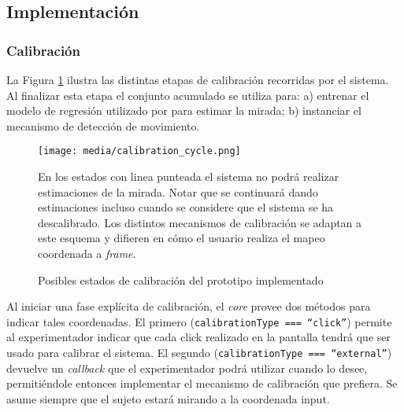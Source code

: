 




\subsection{Implementación}
\subsubsection{Calibración}

La Figura \ref{fig:calibration_cycle} ilustra las distintas etapas de
calibración recorridas por el sistema.
Al finalizar esta etapa el conjunto acumulado se utiliza para: a) entrenar el
modelo de regresión utilizado por \webgazer para estimar la mirada; b)
instanciar el mecanismo de detección de movimiento.

\begin{figure}
    \centering
    \texttt{[image: media/calibration\_cycle.png]}
    \caption{Posibles estados de calibración del prototipo implementado}
    En los estados con linea punteada el sistema no podrá realizar estimaciones
    de la mirada.
    Notar que se continuará dando estimaciones incluso cuando se considere que
    el sistema se ha descalibrado.
    Los distintos mecanismos de calibración se adaptan a este esquema y
    difieren en cómo el usuario realiza el mapeo coordenada a \textit{frame}.
    \label{fig:calibration_cycle}
\end{figure}

Al iniciar una fase explícita de calibración, el \textit{core} provee dos
métodos para indicar tales coordenadas.
El primero (\texttt{calibrationType === “click”}) permite al experimentador
indicar que cada click realizado en la pantalla tendrá que ser usado para
calibrar el sistema.
El segundo (\texttt{calibrationType === “external”}) devuelve un
\textit{callback} que el experimentador podrá utilizar cuando lo desee,
permitiéndole entonces implementar el mecanismo de calibración que prefiera.
Se asume siempre que el sujeto estará mirando a la coordenada input.

